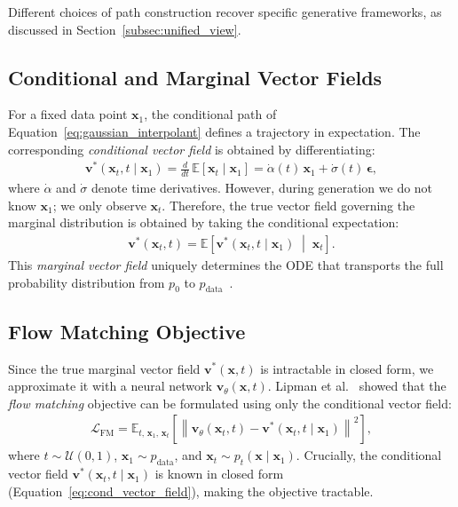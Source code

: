 Different choices of path construction recover specific generative frameworks, as discussed in Section~\ref{subsec:unified_view}.

\subsection{Conditional and Marginal Vector Fields}
\label{subsec:vector_fields}

For a fixed data point $\mathbf{x}_1$, the conditional path of Equation~\eqref{eq:gaussian_interpolant} defines a trajectory in expectation. The corresponding \emph{conditional vector field} is obtained by differentiating:
\begin{align}
    \mathbf{v}^*(\mathbf{x}_t, t \mid \mathbf{x}_1) = \frac{d}{dt}\,\mathbb{E}[\mathbf{x}_t \mid \mathbf{x}_1] = \dot{\alpha}(t)\,\mathbf{x}_1 + \dot{\sigma}(t)\,\boldsymbol{\epsilon},
    \label{eq:cond_vector_field}
\end{align}
where $\dot{\alpha}$ and $\dot{\sigma}$ denote time derivatives. However, during generation we do not know $\mathbf{x}_1$; we only observe $\mathbf{x}_t$. Therefore, the true vector field governing the marginal distribution is obtained by taking the conditional expectation:
\begin{align}
    \mathbf{v}^*(\mathbf{x}_t, t) = \mathbb{E}\!\left[\mathbf{v}^*(\mathbf{x}_t, t \mid \mathbf{x}_1) \;\middle|\; \mathbf{x}_t\right].
    \label{eq:marginal_vector_field}
\end{align}
This \emph{marginal vector field} uniquely determines the ODE that transports the full probability distribution from $p_0$ to $p_{\text{data}}$~\cite{lipman2023flow}.

\subsection{Flow Matching Objective}
\label{subsec:flow_matching}

Since the true marginal vector field $\mathbf{v}^*(\mathbf{x}, t)$ is intractable in closed form, we approximate it with a neural network $\mathbf{v}_\theta(\mathbf{x}, t)$. Lipman et al.~\cite{lipman2023flow} showed that the \emph{flow matching} objective can be formulated using only the conditional vector field:
\begin{align}
    \mathcal{L}_{\text{FM}} = \mathbb{E}_{t,\, \mathbf{x}_1,\, \mathbf{x}_t}\!\left[\left\|\mathbf{v}_\theta(\mathbf{x}_t, t) - \mathbf{v}^*(\mathbf{x}_t, t \mid \mathbf{x}_1)\right\|^2\right],
    \label{eq:flow_matching}
\end{align}
where $t \sim \mathcal{U}(0, 1)$, $\mathbf{x}_1 \sim p_{\text{data}}$, and $\mathbf{x}_t \sim p_t(\mathbf{x} \mid \mathbf{x}_1)$. Crucially, the conditional vector field $\mathbf{v}^*(\mathbf{x}_t, t \mid \mathbf{x}_1)$ is known in closed form (Equation~\ref{eq:cond_vector_field}), making the objective tractable.

